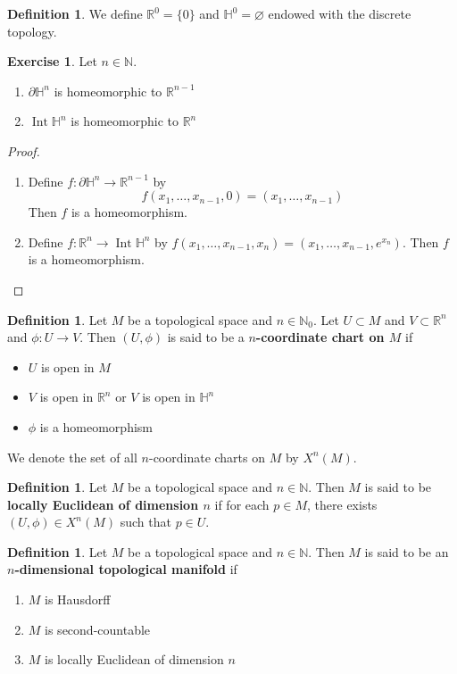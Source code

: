 \documentclass{book}
\theoremstyle{definition}
\newtheorem{defn}[definition]{Definition}
\newtheorem{ex}[definition]{Exercise}
\renewcommand{\H}{\mathbb{H}}
\newcommand{\N}{\mathbb{N}}
\newcommand{\R}{\mathbb{R}}
\DeclareMathOperator{\Int}{Int}
\DeclareMathOperator*{\0}{\mbf{0}}
\DeclareMathOperator*{\1}{\mbf{1}}
\newcommand{\tbf}[1]{\textbf{#1}}
\newcommand{\p}{\partial}
\begin{document}
	\begin{defn}
		We define $\R^0 = \{0\}$ and $\H^0 = \varnothing$ endowed with the discrete topology.
	\end{defn}
	
	\begin{ex} Let $n \in \N$.
	\begin{enumerate}
		\item $\p \H^n$ is homeomorphic to $\R^{n-1}$
		\item $\Int \H^n$ is homeomorphic to $\R^n$
	\end{enumerate}  
	\end{ex}
	
	\begin{proof}\
	\begin{enumerate}
		\item Define $f: \p \H^n \rightarrow \R^{n-1}$ by 
		$$f(x_1, \ldots, x_{n-1}, 0) = (x_1, \ldots, x_{n-1})$$ 
		Then $f$ is a homeomorphism.
		\item Define $f: \R^n \rightarrow \Int \H^n$ by $f(x_1, \ldots, x_{n-1}, x_n) = (x_1, \ldots, x_{n-1}, e^{x_n})$. Then $f$ is a homeomorphism.
	\end{enumerate}
	\end{proof}		
	
	\begin{defn}
		Let $M$ be a topological space and $n \in \N_0$. Let $U \subset M$ and $V \subset \R^n$ and $\phi:U \rightarrow V$. Then $(U, \phi)$ is said to be a \textbf{$n$-coordinate chart on $M$} if 
		\begin{itemize}
			\item $U$ is open in $M$
			\item $V$ is open in $\R^n$ or $V$ is open in $\H^n$
			\item $\phi$ is a homeomorphism 
		\end{itemize}
	We denote the set of all $n$-coordinate charts on $M$ by $X^n(M)$.
	\end{defn}

	\begin{defn}
		Let $M$ be a topological space and $n \in \N$. Then $M$ is said to be \tbf{locally Euclidean of dimension $n$} if for each $p \in M$, there exists $(U, \phi) \in X^n(M)$ such that $p \in U$. 
	\end{defn}

	\begin{defn}
		Let $M$ be a topological space and $n \in \N$. Then $M$ is said to be an \tbf{$n$-dimensional topological manifold} if 
		\begin{enumerate}
			\item $M$ is Hausdorff
			\item $M$ is second-countable
			\item $M$ is locally Euclidean of dimension $n$
		\end{enumerate}
	\end{defn}
\end{document}
